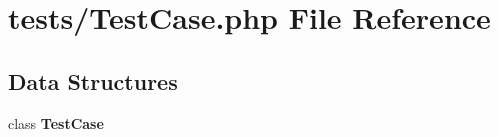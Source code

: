 \section{tests/\+Test\+Case.php File Reference}
\label{tests_2_test_case_8php}
\subsection*{Data Structures}
\begin{DoxyCompactItemize}
\item 
class {\bf Test\+Case}
\end{DoxyCompactItemize}
